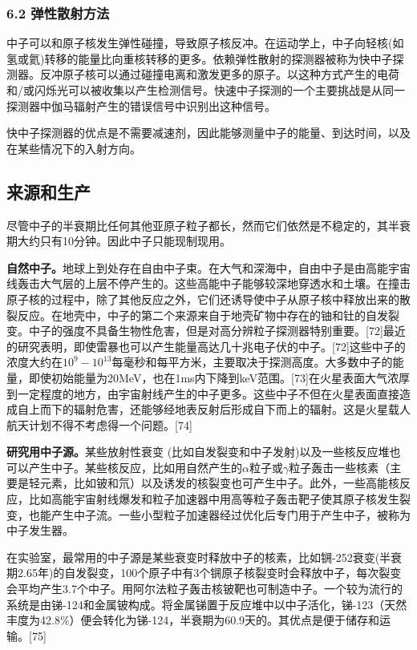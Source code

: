 \subsubsection{6.2 弹性散射方法}
中子可以和原子核发生弹性碰撞，导致原子核反冲。在运动学上，中子向轻核(如氢或氦)转移的能量比向重核转移的更多。依赖弹性散射的探测器被称为快中子探测器。反冲原子核可以通过碰撞电离和激发更多的原子。以这种方式产生的电荷和/或闪烁光可以被收集以产生检测信号。快速中子探测的一个主要挑战是从同一探测器中伽马辐射产生的错误信号中识别出这种信号。

快中子探测器的优点是不需要减速剂，因此能够测量中子的能量、到达时间，以及在某些情况下的入射方向。

\subsection{来源和生产}
尽管中子的半衰期比任何其他亚原子粒子都长，然而它们依然是不稳定的，其半衰期大约只有10分钟。因此中子只能现制现用。

\textbf{自然中子。}地球上到处存在自由中子束。在大气和深海中，自由中子是由高能宇宙线轰击大气层的上层不停产生的。这些高能中子能够较深地穿透水和土壤。在撞击原子核的过程中，除了其他反应之外，它们还诱导使中子从原子核中释放出来的散裂反应。在地壳中，中子的第二个来源来自于地壳矿物中存在的铀和钍的自发裂变。中子的强度不具备生物性危害，但是对高分辨粒子探测器特别重要。[72]最近的研究表明，即使雷暴也可以产生能量高达几十兆电子伏的中子。[72]这些中子的浓度大约在$10^{9}-10^{13}$每毫秒和每平方米，主要取决于探测高度。大多数中子的能量，即使初始能量为20MeV，也在1ms内下降到keV范围。[73]在火星表面大气浓厚到一定程度的地方，由宇宙射线产生的中子更多。这些中子不但在火星表面直接造成自上而下的辐射危害，还能够经地表反射后形成自下而上的辐射。这是火星载人航天计划不得不考虑得一个问题。[74]

\textbf{研究用中子源。}某些放射性衰变 (比如自发裂变和中子发射)以及一些核反应堆也可以产生中子。某些核反应，比如用自然产生的$\alpha$粒子或$\gamma$粒子轰击一些核素（主要是轻元素，比如铍和氘）以及诱发的核裂变也可产生中子。此外，一些高能核反应，比如高能宇宙射线爆发和粒子加速器中用高等粒子轰击靶子使其原子核发生裂变，也能产生中子流。一些小型粒子加速器经过优化后专门用于产生中子，被称为中子发生器。

在实验室，最常用的中子源是某些衰变时释放中子的核素，比如锎-252衰变(半衰期2.65年)的自发裂变，100个原子中有3个锎原子核裂变时会释放中子，每次裂变会平均产生3.7个中子。用阿尔法粒子轰击核铍靶也可制造中子。一个较为流行的系统是由锑-124和金属铍构成。将金属锑置于反应堆中以中子活化，锑-123（天然丰度为42.8\%）便会转化为锑-124，半衰期为60.9天的。其优点是便于储存和运输。[75]








